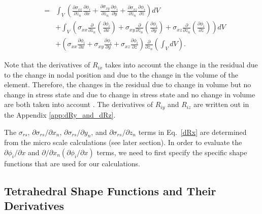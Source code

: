 \begin{eqnarray}
&=& \int_V \left(\frac{\partial \sigma_{xx}}{\partial z_n}\frac{\partial \phi_i}{\partial x} +\frac{\partial \sigma_{xy}}{\partial z_n} \frac{\partial \phi_i}{\partial y} + \frac{\partial \sigma_{xz}}{\partial z_n}\frac{\partial \phi_i}{\partial z}  \right) dV \nonumber\\
&&+ \int_V \left(\sigma_{xx} \frac{\partial}{\partial z_n} \left(\frac{\partial \phi_i}{\partial x}\right)+ \sigma_{xy} \frac{\partial}{\partial z_n} \left(\frac{\partial \phi_i}{\partial y}\right) + \sigma_{xz} \frac{\partial}{\partial z_n} \left(\frac{\partial \phi_i}{\partial z}\right) \right) dV \nonumber\\
&& + \left(  \sigma_{xx} \frac{\partial \phi_i}{\partial x} + \sigma_{xy} \frac{\partial \phi_i}{\partial y} + \sigma_{xz} \frac{\partial \phi_i}{\partial z} \right) \frac{\partial}{\partial z_n} \left(\int_V dV \right).
\label{dRx}
\end{eqnarray}
%

Note that the derivatives of $R_{ix}$ takes into account the change in the residual due to the change in nodal position and due to the change in the volume of the element. Therefore, the changes in the residual due to change in volume but no change in stress state and due to change in stress state and no change in volume are both taken into account . The derivatives of $R_{iy}$ and $R_{iz}$ are written out in the Appendix \ref{app:dRy_and_dRz}.

The $\sigma_{rs}$, $\partial \sigma_{rs}/\partial x_n$, $\partial \sigma_{rs}/\partial y_n$, and $\partial \sigma_{rs}/\partial z_n$ terms in Eq.\ \eqref{dRx} are determined from the micro scale calculations (see later section). In order to evaluate the $\partial \phi_i/\partial x$ and $\partial /\partial x_n (\partial \phi_i/\partial x)$ terms, we need to first specify the specific shape functions that are used for our calculations.

\subsection{Tetrahedral Shape Functions and Their Derivatives}

